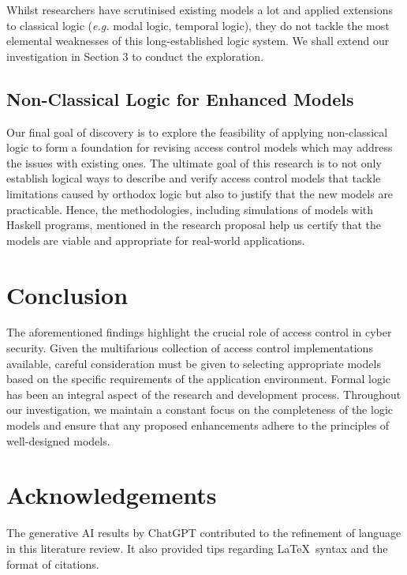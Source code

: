 \documentclass{article}
\begin{document}
Whilst researchers have scrutinised existing models a lot and applied extensions to classical logic (\textit{e.g.} modal logic, temporal logic), they do not tackle the most elemental weaknesses of this long-established logic system. We shall extend our investigation in Section 3 to conduct the exploration.

\subsection{Non-Classical Logic for Enhanced Models}

Our final goal of discovery is to explore the feasibility of applying non-classical logic to form a foundation for revising access control models which may address the issues with existing ones. The ultimate goal of this research is to not only establish logical ways to describe and verify access control models that tackle limitations caused by orthodox logic but also to justify that the new models are practicable. Hence, the methodologies, including simulations of models with Haskell programs, mentioned in the research proposal help us certify that the models are viable and appropriate for real-world applications.

\section{Conclusion}

The aforementioned findings highlight the crucial role of access control in cyber security. Given the multifarious collection of access control implementations available, careful consideration must be given to selecting appropriate models based on the specific requirements of the application environment. Formal logic has been an integral aspect of the research and development process. Throughout our investigation, we maintain a constant focus on the completeness of the logic models and ensure that any proposed enhancements adhere to the principles of well-designed models.

\newpage




\section*{Acknowledgements}

The generative AI results by ChatGPT contributed to the refinement of language in this literature review. It also provided tips regarding \LaTeX\ syntax and the format of citations.
\end{document}
